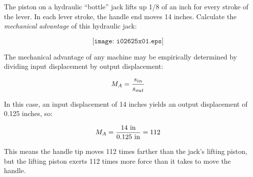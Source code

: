 

The piston on a hydraulic ``bottle'' jack lifts up 1/8 of an inch for every stroke of the lever.  In each lever stroke, the handle end moves 14 inches.  Calculate the {\it mechanical advantage} of this hydraulic jack:

$$\texttt{[image: i02625x01.eps]}$$







The mechanical advantage of any machine may be empirically determined by dividing input displacement by output displacement:

$$M_A = {s_{in} \over s_{out}}$$

In this case, an input displacement of 14 inches yields an output displacement of 0.125 inches, so:

$$M_A = {14 \hbox{ in} \over 0.125 \hbox{ in}} = 112$$

This means the handle tip moves 112 times farther than the jack's lifting piston, but the lifting piston exerts 112 times more force than it takes to move the handle.











